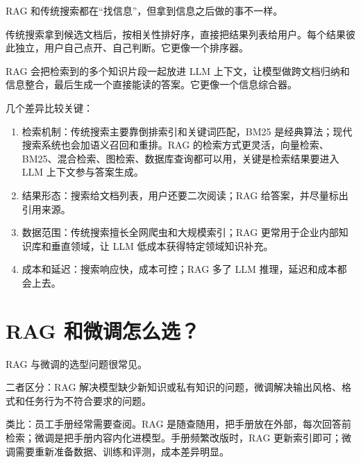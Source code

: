 \documentclass[9pt,a4paper,twocolumn]{ctexart}
\begin{document}
RAG 和传统搜索都在“找信息”，但拿到信息之后做的事不一样。



传统搜索拿到候选文档后，按相关性排好序，直接把结果列表给用户。每个结果彼此独立，用户自己点开、自己判断。它更像一个排序器。



RAG 会把检索到的多个知识片段一起放进 LLM 上下文，让模型做跨文档归纳和信息整合，最后生成一个直接能读的答案。它更像一个信息综合器。



几个差异比较关键：


\begin{enumerate}[itemsep=1pt, topsep=2pt]
  \item 检索机制：传统搜索主要靠倒排索引和关键词匹配，BM25 是经典算法；现代搜索系统也会加语义召回和重排。RAG 的检索方式更灵活，向量检索、BM25、混合检索、图检索、数据库查询都可以用，关键是检索结果要进入 LLM 上下文参与答案生成。
  \item 结果形态：搜索给文档列表，用户还要二次阅读；RAG 给答案，并尽量标出引用来源。
  \item 数据范围：传统搜索擅长全网爬虫和大规模索引；RAG 更常用于企业内部知识库和垂直领域，让 LLM 低成本获得特定领域知识补充。
  \item 成本和延迟：搜索响应快，成本可控；RAG 多了 LLM 推理，延迟和成本都会上去。
\end{enumerate}


\section*{RAG 和微调怎么选？}


RAG 与微调的选型问题很常见。



二者区分：RAG 解决模型缺少新知识或私有知识的问题，微调解决输出风格、格式和任务行为不符合要求的问题。



类比：员工手册经常需要查阅。RAG 是随查随用，把手册放在外部，每次回答前检索；微调是把手册内容内化进模型。手册频繁改版时，RAG 更新索引即可；微调需要重新准备数据、训练和评测，成本差异明显。
\end{document}
